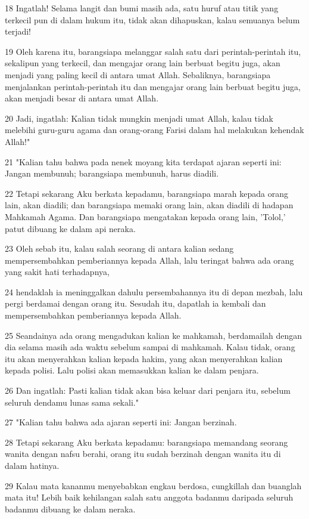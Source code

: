\par 18 Ingatlah! Selama langit dan bumi masih ada, satu huruf atau titik yang terkecil pun di dalam hukum itu, tidak akan dihapuskan, kalau semuanya belum terjadi!
\par 19 Oleh karena itu, barangsiapa melanggar salah satu dari perintah-perintah itu, sekalipun yang terkecil, dan mengajar orang lain berbuat begitu juga, akan menjadi yang paling kecil di antara umat Allah. Sebaliknya, barangsiapa menjalankan perintah-perintah itu dan mengajar orang lain berbuat begitu juga, akan menjadi besar di antara umat Allah.
\par 20 Jadi, ingatlah: Kalian tidak mungkin menjadi umat Allah, kalau tidak melebihi guru-guru agama dan orang-orang Farisi dalam hal melakukan kehendak Allah!"
\par 21 "Kalian tahu bahwa pada nenek moyang kita terdapat ajaran seperti ini: Jangan membunuh; barangsiapa membunuh, harus diadili.
\par 22 Tetapi sekarang Aku berkata kepadamu, barangsiapa marah kepada orang lain, akan diadili; dan barangsiapa memaki orang lain, akan diadili di hadapan Mahkamah Agama. Dan barangsiapa mengatakan kepada orang lain, 'Tolol,' patut dibuang ke dalam api neraka.
\par 23 Oleh sebab itu, kalau salah seorang di antara kalian sedang mempersembahkan pemberiannya kepada Allah, lalu teringat bahwa ada orang yang sakit hati terhadapnya,
\par 24 hendaklah ia meninggalkan dahulu persembahannya itu di depan mezbah, lalu pergi berdamai dengan orang itu. Sesudah itu, dapatlah ia kembali dan mempersembahkan pemberiannya kepada Allah.
\par 25 Seandainya ada orang mengadukan kalian ke mahkamah, berdamailah dengan dia selama masih ada waktu sebelum sampai di mahkamah. Kalau tidak, orang itu akan menyerahkan kalian kepada hakim, yang akan menyerahkan kalian kepada polisi. Lalu polisi akan memasukkan kalian ke dalam penjara.
\par 26 Dan ingatlah: Pasti kalian tidak akan bisa keluar dari penjara itu, sebelum seluruh dendamu lunas sama sekali."
\par 27 "Kalian tahu bahwa ada ajaran seperti ini: Jangan berzinah.
\par 28 Tetapi sekarang Aku berkata kepadamu: barangsiapa memandang seorang wanita dengan nafsu berahi, orang itu sudah berzinah dengan wanita itu di dalam hatinya.
\par 29 Kalau mata kananmu menyebabkan engkau berdosa, cungkillah dan buanglah mata itu! Lebih baik kehilangan salah satu anggota badanmu daripada seluruh badanmu dibuang ke dalam neraka.
